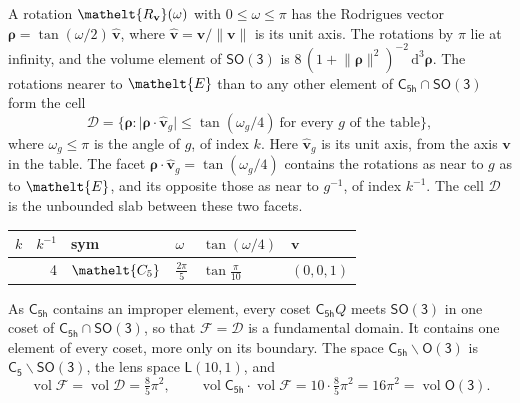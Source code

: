 \documentclass[10pt,a4paper]{article}
\numberwithin{equation}{section}
\newcommand{\eltfont}[1]{{\let\sigma\eltsigma\mathelt{#1}}}
\newcommand{\grp}[1]{\mathsf{#1}}
\newcommand{\cls}[1]{\eltfont{#1}}
\newcommand{\elt}[1]{\eltfont{#1}}
\newcommand{\dirvec}[3]{(#1, #2, #3)}
\newcommand{\unitaxis}{\hat{\mathbf{v}}}
\newcommand{\vv}{\mathbf{v}}
\newcommand{\diff}{\mathrm{d}}
\newcommand{\vol}{\operatorname{vol}}
\newcommand{\rodrigues}{\boldsymbol{\rho}}
\newcommand{\fcell}{\mathcal{D}}
\newcommand{\fdomain}{\mathcal{F}}
\newcommand{\lensspace}[2]{\mathsf{L}(#1, #2)}
\begin{document}
\leavevmode\label{n:vector.rodrigues}\label{n:vector.unitaxis}A rotation $\elt{R_{\vv}}(\omega)$ with $0 \le \omega \le \pi$ has the Rodrigues vector $\rodrigues = \tan(\omega/2)\,\unitaxis$, where $\unitaxis = \vv/\lVert\vv\rVert$ is its unit axis. The rotations by $\pi$ lie at infinity, and the volume element of \href{SO3.pdf}{$\grp{SO(3)}$} is $8\,(1 + \lVert\rodrigues\rVert^2)^{-2}\,\diff^3\rodrigues$.
\leavevmode\label{n:set.cell}The rotations nearer to $\elt{E}$ than to any other element of $\grp{C_{5h}} \cap \grp{SO(3)}$ form the cell
\begin{equation}\label{e:cell}\fcell = \bigl\{\rodrigues : \lvert\rodrigues\cdot\unitaxis_g\rvert \le \tan(\omega_g/4)\ \text{for every $g$ of the table}\bigr\},\end{equation}
where $\omega_g \le \pi$ is the angle of $g$, of index $k$. Here $\unitaxis_g$ is its unit axis, from the axis $\vv$ in the table. The facet $\rodrigues\cdot\unitaxis_g = \tan(\omega_g/4)$ contains the rotations as near to $g$ as to $\elt{E}$, and its opposite those as near to $g^{-1}$, of index $k^{-1}$. The cell $\fcell$ is the unbounded slab between these two facets.
{\small{\renewcommand{\arraystretch}{1.3}\begin{longtable}{@{}rrllll@{}}\toprule
$k$ & $k^{-1}$ & sym & $\omega$ & $\tan(\omega/4)$ & $\vv$\\\midrule\endhead
\bottomrule\endfoot\endlastfoot
1 & 4 & $\cls{C_{5}}$ & $\tfrac{2\pi}{5}$ & $\tan\tfrac{\pi}{10}$ & $\dirvec{0}{0}{1}$\\
\bottomrule\end{longtable}}}

\leavevmode\label{n:set.fundamental}As $\grp{C_{5h}}$ contains an improper element, every coset $\grp{C_{5h}}Q$ meets \href{SO3.pdf}{$\grp{SO(3)}$} in one coset of $\grp{C_{5h}} \cap \grp{SO(3)}$, so that $\fdomain = \fcell$ is a fundamental domain. It contains one element of every coset, more only on its boundary.
\leavevmode\label{n:set.lens}The space $\grp{C_{5h}}\backslash\grp{O(3)}$ is $\grp{C_{5}}\backslash\grp{SO(3)}$, the lens space $\lensspace{10}{1}$, and
\begin{equation}\label{e:volume}\vol\fdomain = \vol\fcell = \tfrac{8}{5}\pi^2,\qquad \vol\grp{C_{5h}}\cdot\vol\fdomain = 10\cdot \tfrac{8}{5}\pi^2 = 16\pi^2 = \vol\grp{O(3)}.\end{equation}
\end{document}
